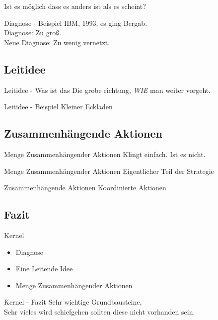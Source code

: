 \begin{frame}[standout]
    Ist es möglich dass es anders ist als es scheint?
\end{frame}


\begin{frame}[c]{Diagnose - Beispiel}
    IBM, 1993, es ging Bergab. \\
    Diagnose: Zu groß. \\ \pause
    Neue Diagnose: Zu wenig vernetzt.
\end{frame}


\subsection{Leitidee}


\begin{frame}[c]{Leitidee - Was ist das}
    \Large
    Die grobe richtung, {\em WIE} man weiter vorgeht.
\end{frame}


\begin{frame}[c]{Leitidee - Beispiel}
    \Large
    Kleiner Eckladen
\end{frame}


\subsection{Zusammenhängende Aktionen}


\begin{frame}[c]{Menge Zusammenhängender Aktionen}
    \Huge
    Klingt einfach. Ist es nicht.
\end{frame}


\begin{frame}[c]{Menge Zusammenhängender Aktionen}
    \Huge
    Eigentlicher Teil der Strategie
\end{frame}


\begin{frame}[c]{Zusammenhängende Aktionen}
    \Huge
    Koordinierte Aktionen
\end{frame}


\subsection{Fazit}


\begin{frame}[c]{Kernel}
    \Large
    \begin{itemize}
        \item Diagnose
            \pause
        \item Eine Leitende Idee
            \pause
        \item Menge Zusammenhängender Aktionen
    \end{itemize}
\end{frame}


\begin{frame}{Kernel - Fazit}
    \large
    Sehr wichtige Grundbausteine, \\
    Sehr vieles wird schiefgehen sollten diese nicht vorhanden sein.
\end{frame}






